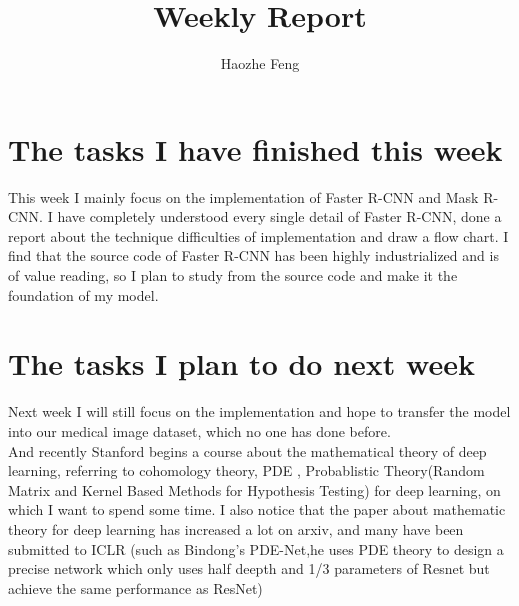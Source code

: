 \documentclass[twocolumn]{article}
\title{Weekly Report}
\author{Haozhe Feng}
\begin{document}
	\maketitle{}
\section{The tasks I have finished this week}
This week I mainly focus on the implementation of Faster R-CNN and Mask R-CNN. I have completely understood every single detail of Faster R-CNN, done a report about the technique difficulties of implementation and draw a flow chart. I find that the source code of Faster R-CNN has been highly industrialized and is of value reading, so I plan to study from the source code and make it the foundation of my model.\\

\section{The tasks I plan to do next week}
Next week I will still focus on the implementation and hope to transfer the model into our medical image dataset, which no one has done before.\\

\vspace*{.3cm}
\noindent And recently Stanford begins a course about the mathematical theory of deep learning, referring to cohomology theory, PDE , Probablistic Theory(Random Matrix and Kernel Based Methods for Hypothesis Testing) for deep learning, on which I want to spend some time. I also notice that the paper about mathematic theory for deep learning has increased a lot on arxiv, and many have been submitted to ICLR (such as Bindong's PDE-Net\cite{Dong},he uses PDE theory to design a precise network which only uses half deepth and 1/3 parameters of Resnet but achieve the same performance as ResNet)


\end{document}
